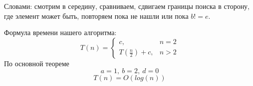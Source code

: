 \documentclass[../main.tex]{subfiles}
\begin{document}
	Словами: смотрим в середину, сравниваем, сдвигаем границы поиска в сторону, где элемент может быть, повторяем пока не нашли или пока $b != e$.
	
	
	\begin{time}
		Формула времени нашего алгоритма:
		\[
		T(n) = 
		\begin{cases}
			c, & n = 2 \\
			T(\frac{n}{2}) + c, & n > 2
		\end{cases}
		\]
		По основной теореме 
		\[
		a = 1, \ b = 2, \ d = 0
		\]
		\[
		T(n) = O(log(n))
		\]
	\end{time}
	
	
	
	\pagebreak
	
\end{document}
